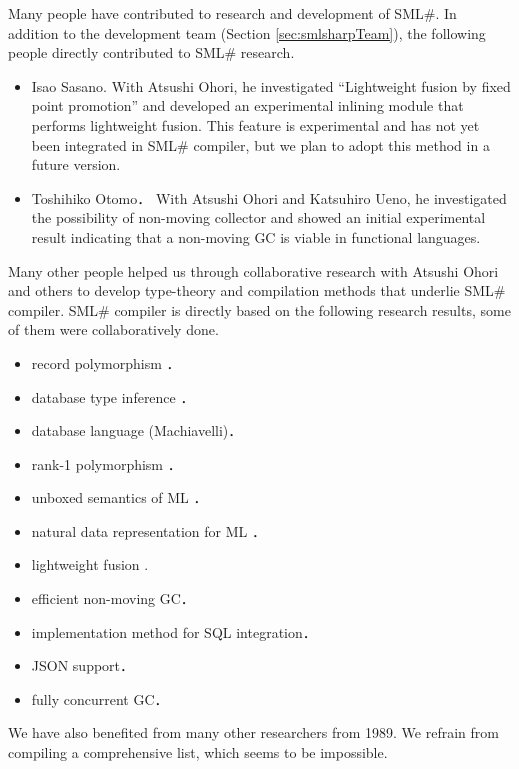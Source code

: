 \documentclass{jbook}
\newcommand{\smlsharp}{SML\#}
\begin{document}
	Many people have contributed to research and development of
\smlsharp{}.
	In addition to the development team (Section
\ref{sec:smlsharpTeam}), the following people directly contributed to 
\smlsharp{} research.
\begin{itemize}
\item Isao Sasano.
With Atsushi Ohori, he investigated 
``Lightweight fusion by fixed point promotion'' and 
developed an experimental inlining module that performs lightweight
fusion.
	This feature is experimental and has not yet been integrated in
\smlsharp{} compiler, but we plan to adopt this method in a future
version.
\item Toshihiko Otomo．
	With Atsushi Ohori and Katsuhiro Ueno, he investigated the
possibility of non-moving collector and showed an initial experimental
result indicating that a non-moving GC is viable in functional
languages.
\end{itemize}
	Many other people helped us through collaborative research with
Atsushi Ohori and others to develop type-theory and compilation methods
that underlie \smlsharp{} compiler.
	\smlsharp{} compiler is directly based on the
following research results, some of them were collaboratively done.
\begin{itemize}
\item record polymorphism \cite{ohor92popl,ohor95toplas}．
\item database type inference \cite{ohor88lfp}．
\item database language (Machiavelli)\cite{ohor89sigmod,bune96tods}．
\item rank-1 polymorphism \cite{ohor99icfp}．
\item unboxed semantics of ML \cite{ohor97unbox}．
\item natural data representation for ML \cite{nguyen06ppdp}．
\item lightweight fusion \cite{ohor07popl}.
\item efficient non-moving GC\cite{ueno11icfp}．
\item implementation method for SQL integration\cite{ohori11icfp}．
\item JSON support\cite{ohori16ecoop}．
\item fully concurrent GC\cite{ueno16icfp}．
\end{itemize}
	We have also benefited from many other researchers from 1989.
	We refrain from compiling a comprehensive list, which seems to
be impossible. 
\fi%
\end{document}

